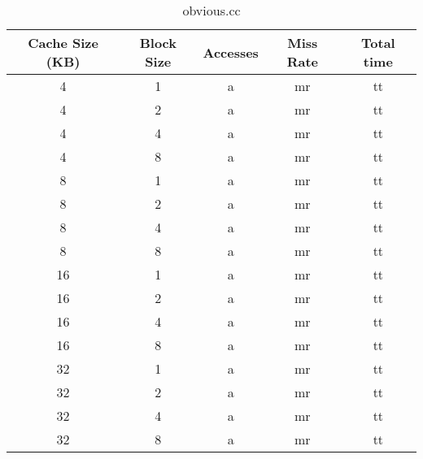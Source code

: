 \documentclass[letterpaper, 12pt, oneside]{memoir}
\begin{document}
\begin{table}[H]
\centering
\begin{tabular}{c|c|c|c|c}
    Cache Size (KB)  & Block Size & Accesses & Miss Rate & Total time \\ \hline 
    4  & 1 & a & mr & tt \\ 
    4  & 2 & a & mr & tt \\ 
    4  & 4 & a & mr & tt \\ 
    4  & 8 & a & mr & tt \\ \hline
    8  & 1 & a & mr & tt \\ 
    8  & 2 & a & mr & tt \\ 
    8  & 4 & a & mr & tt \\ 
    8  & 8 & a & mr & tt \\ \hline
    16 & 1 & a & mr & tt \\ 
    16 & 2 & a & mr & tt \\ 
    16 & 4 & a & mr & tt \\ 
    16 & 8 & a & mr & tt \\ \hline
    32 & 1 & a & mr & tt \\ 
    32 & 2 & a & mr & tt \\ 
    32 & 4 & a & mr & tt \\ 
    32 & 8 & a & mr & tt \\ 
\end{tabular}
\caption{obvious.cc}
\end{table}
\end{document}
